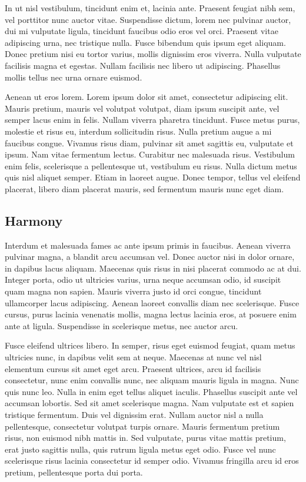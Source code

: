 \documentclass[9pt]{memoir}
\begin{document}
In ut nisl vestibulum, tincidunt enim et, lacinia ante. Praesent feugiat nibh sem, vel porttitor nunc auctor vitae. Suspendisse dictum, lorem nec pulvinar auctor, dui mi vulputate ligula, tincidunt faucibus odio eros vel orci. Praesent vitae adipiscing urna, nec tristique nulla. Fusce bibendum quis ipsum eget aliquam. Donec pretium nisi eu tortor varius, mollis dignissim eros viverra. Nulla vulputate facilisis magna et egestas. Nullam facilisis nec libero ut adipiscing. Phasellus mollis tellus nec urna ornare euismod.

Aenean ut eros lorem. Lorem ipsum dolor sit amet, consectetur adipiscing elit. Mauris pretium, mauris vel volutpat volutpat, diam ipsum suscipit ante, vel semper lacus enim in felis. Nullam viverra pharetra tincidunt. Fusce metus purus, molestie et risus eu, interdum sollicitudin risus. Nulla pretium augue a mi faucibus congue. Vivamus risus diam, pulvinar sit amet sagittis eu, vulputate et ipsum. Nam vitae fermentum lectus. Curabitur nec malesuada risus. Vestibulum enim felis, scelerisque a pellentesque ut, vestibulum eu risus. Nulla dictum metus quis nisl aliquet semper. Etiam in laoreet augue. Donec tempor, tellus vel eleifend placerat, libero diam placerat mauris, sed fermentum mauris nunc eget diam.

\subsection{Harmony}
Interdum et malesuada fames ac ante ipsum primis in faucibus. Aenean viverra pulvinar magna, a blandit arcu accumsan vel. Donec auctor nisi in dolor ornare, in dapibus lacus aliquam. Maecenas quis risus in nisi placerat commodo ac at dui. Integer porta, odio ut ultricies varius, urna neque accumsan odio, id suscipit quam magna non sapien. Mauris viverra justo id orci congue, tincidunt ullamcorper lacus adipiscing. Aenean laoreet convallis diam nec scelerisque. Fusce cursus, purus lacinia venenatis mollis, magna lectus lacinia eros, at posuere enim ante at ligula. Suspendisse in scelerisque metus, nec auctor arcu.

Fusce eleifend ultrices libero. In semper, risus eget euismod feugiat, quam metus ultricies nunc, in dapibus velit sem at neque. Maecenas at nunc vel nisl elementum cursus sit amet eget arcu. Praesent ultrices, arcu id facilisis consectetur, nunc enim convallis nunc, nec aliquam mauris ligula in magna. Nunc quis nunc leo. Nulla in enim eget tellus aliquet iaculis. Phasellus suscipit ante vel accumsan lobortis. Sed sit amet scelerisque magna. Nam vulputate est et sapien tristique fermentum. Duis vel dignissim erat. Nullam auctor nisl a nulla pellentesque, consectetur volutpat turpis ornare. Mauris fermentum pretium risus, non euismod nibh mattis in. Sed vulputate, purus vitae mattis pretium, erat justo sagittis nulla, quis rutrum ligula metus eget odio. Fusce vel nunc scelerisque risus lacinia consectetur id semper odio. Vivamus fringilla arcu id eros pretium, pellentesque porta dui porta.
\end{document}
